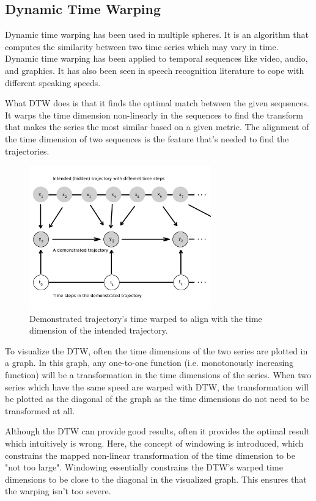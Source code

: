 \documentclass[hidelinks,BTech]{iitmdiss}
\begin{document}
\subsection{Dynamic Time Warping}

Dynamic time warping \cite{DTW} has been used in multiple spheres. It is an algorithm that computes the similarity between two time series which may vary in time. Dynamic time warping has been applied to temporal sequences like video, audio, and graphics. It has also been seen in speech recognition literature to cope with different speaking speeds.

What DTW does is that it finds the optimal match between the given sequences. It warps the time dimension non-linearly in the sequences to find the transform that makes the series the most similar based on a given metric. The alignment of the time dimension of two sequences is the feature that's needed to find the trajectories.

\begin{figure}[H]
  \centering
    \includegraphics[width=0.7\textwidth]{timewarp.png}
    \caption{Demonstrated trajectory's time warped to align with the time dimension of the intended trajectory.}
\end{figure}

To visualize the DTW, often the time dimensions of the two series are plotted in a graph. In this graph, any one-to-one function (i.e. monotonously increasing function) will be a transformation in the time dimensions of the series. When two series which have the same speed are warped with DTW, the transformation will be plotted as the diagonal of the graph as the time dimensions do not need to be transformed at all.

Although the DTW can provide good results, often it provides the optimal result which intuitively is wrong. Here, the concept of windowing is introduced, which constrains the mapped non-linear transformation of the time dimension to be "not too large". Windowing essentially constrains the DTW's warped time dimensions to be close to the diagonal in the visualized graph. This ensures that the warping isn't too severe.
\end{document}

